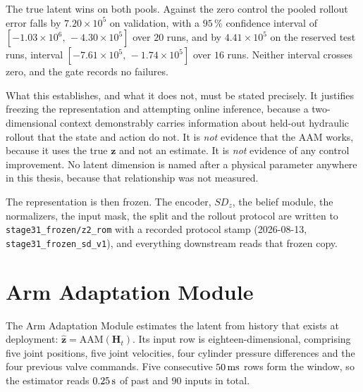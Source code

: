 The true latent wins on both pools. Against the zero control the pooled
rollout error falls by $7.20\times10^{5}$ on validation, with a $95\,\%$
confidence interval of $[-1.03\times10^{6},\, -4.30\times10^{5}]$ over $20$
runs, and by $4.41\times10^{5}$ on the reserved test runs, interval
$[-7.61\times10^{5},\, -1.74\times10^{5}]$ over $16$ runs. Neither interval
crosses zero, and the gate records no failures.

What this establishes, and what it does not, must be stated precisely. It
justifies freezing the representation and attempting online inference, because
a two-dimensional context demonstrably carries information about held-out
hydraulic rollout that the state and action do not. It is \emph{not} evidence
that the AAM works, because it uses the true $\bm{z}$ and not an estimate. It
is \emph{not} evidence of any control improvement. No latent dimension is
named after a physical parameter anywhere in this thesis, because that
relationship was not measured.

The representation is then frozen. The encoder, $SD_z$, the belief module, the
normalizers, the input mask, the split and the rollout protocol are written to
\texttt{stage31\_frozen/z2\_rom} with a recorded protocol stamp
(2026-08-13, \texttt{stage31\_frozen\_sd\_v1}), and everything downstream reads
that frozen copy.


\section{Arm Adaptation Module}
\label{sec:models:aam}
The Arm Adaptation Module estimates the latent from history that exists at
deployment: $\hat{\bm{z}} = \mathrm{AAM}(\bm{H}_t)$. Its input row is
eighteen-dimensional, comprising five joint positions, five joint velocities,
four cylinder pressure differences and the four previous valve commands. Five
consecutive $\unit[50]{ms}$ rows form the window, so the estimator reads
$\unit[0.25]{s}$ of past and $90$ inputs in total.

